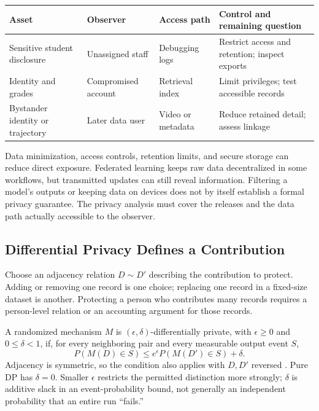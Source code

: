 \par\addvspace{\intextsep}\noindent\begin{minipage}{\linewidth}
\centering\small
\begin{tabular}{@{}L{2.4cm}L{2cm}L{2.2cm}L{3.1cm}@{}}
\toprule
Asset & Observer & Access path & Control and remaining question \\
\midrule
Sensitive student disclosure & Unassigned staff & Debugging logs & Restrict access and retention; inspect exports \\
Identity and grades & Compromised account & Retrieval index & Limit privileges; test accessible records \\
Bystander identity or trajectory & Later data user & Video or metadata & Reduce retained detail; assess linkage \\
\bottomrule
\end{tabular}
\label{tab:privacy-threat-model-example}
\end{minipage}\par\addvspace{\intextsep}

Data minimization, access controls, retention limits, and secure storage can reduce direct exposure. Federated learning keeps raw data decentralized in some workflows, but transmitted updates can still reveal information. Filtering a model's outputs or keeping data on devices does not by itself establish a formal privacy guarantee. The privacy analysis must cover the releases and the data path actually accessible to the observer.

\subsection{Differential Privacy Defines a Contribution}

Choose an adjacency relation $D\sim D'$ describing the contribution to protect. Adding or removing one record is one choice; replacing one record in a fixed-size dataset is another. Protecting a person who contributes many records requires a person-level relation or an accounting argument for those records.

A randomized mechanism $M$ is $(\epsilon,\delta)$-differentially private, with $\epsilon\ge0$ and $0\le\delta<1$, if, for every neighboring pair and every measurable output event $S$,
\[
P(M(D)\in S)\le e^\epsilon P(M(D')\in S)+\delta.
\]
Adjacency is symmetric, so the condition also applies with $D,D'$ reversed \citep{dwork2006,dwork2014privacy}. Pure DP has $\delta=0$. Smaller $\epsilon$ restricts the permitted distinction more strongly; $\delta$ is additive slack in an event-probability bound, not generally an independent probability that an entire run ``fails.''


